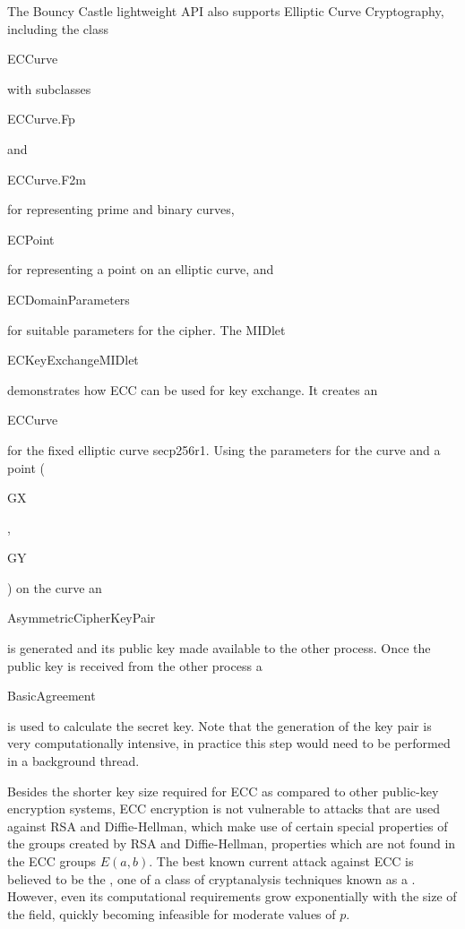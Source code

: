 The Bouncy Castle lightweight API also supports Elliptic Curve Cryptography,
including the class \begin{code}ECCurve\end{code} with subclasses
\begin{code}ECCurve.Fp\end{code} and \begin{code}ECCurve.F2m\end{code}
for representing prime and binary curves,
\begin{code}ECPoint\end{code} for representing a point on an elliptic curve,
and \begin{code}ECDomainParameters\end{code} for suitable parameters for the cipher.
The MIDlet \begin{code}ECKeyExchangeMIDlet\end{code} demonstrates how ECC can be used for
key exchange. It creates an \begin{code}ECCurve\end{code} for the fixed elliptic curve secp256r1.
Using the parameters for the curve and a point
(\begin{code}GX\end{code},\begin{code}GY\end{code}) on the curve
an \begin{code}AsymmetricCipher\-KeyPair\end{code}
is generated and its public key made available to the other process.
Once the public key is received from the other process
a \begin{code}BasicAgreement\end{code} is used to calculate the
secret key.
Note that the generation of the key pair is very computationally intensive,
in practice this step would need to be performed in a background thread.

Besides the shorter key size required for ECC as compared to other public-key encryption
systems, ECC encryption is not vulnerable to  attacks
that are used against RSA and Diffie-Hellman, which make use of certain
special properties of the groups created by RSA and Diffie-Hellman,
properties which are not found in the ECC groups $E(a,b)$.
The best known current attack against ECC is believed to be the ,
one of a class of cryptanalysis techniques known as a .
However, even its computational requirements grow exponentially with the size of the field,
quickly becoming infeasible for moderate values of $p$.


